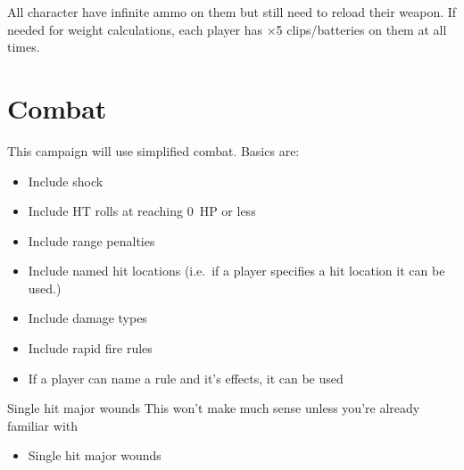 All character have infinite ammo on them but still need to reload their weapon.
If needed for weight calculations, each player has ×5 clips/batteries on them at
all times.


\section{Combat}
\label{sec:combat}

This campaign will use simplified \gurps combat. Basics are:

\begin{itemize}
\item Include shock
\item Include HT rolls at reaching 0~HP or less
\item Include range penalties
\item Include named hit locations (i.e.~if a player specifies a hit location it
  can be used.)
\item Include damage types
\item Include rapid fire rules
\item If a player can name a rule and it's effects, it can be used
\end{itemize}

\begin{proposal}{Single hit major wounds}
  This won't make much sense unless you're already familiar with \gurps
  \begin{itemize}
  \item Single hit major wounds
  \end{itemize}
\end{proposal}

